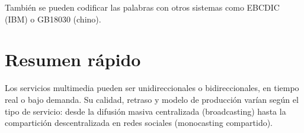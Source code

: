 \documentclass[11pt,a4paper]{article}
\begin{document}
También se pueden codificar las palabras con otros sistemas como EBCDIC (IBM) o GB18030 (chino).

\section{Resumen rápido}

\begin{ResumenBox}
Los servicios multimedia pueden ser unidireccionales o bidireccionales, en tiempo real o bajo demanda. Su calidad, retraso y modelo de producción varían según el tipo de servicio: desde la difusión masiva centralizada (broadcasting) hasta la compartición descentralizada en redes sociales (monocasting compartido).
\end{ResumenBox}
\end{document}

